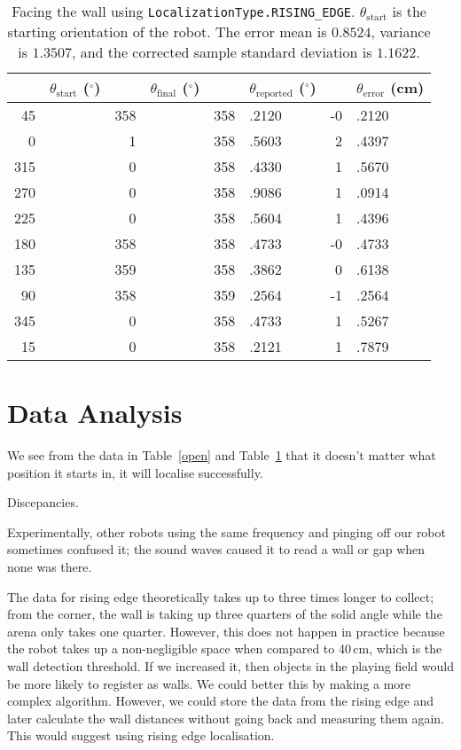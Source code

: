 \documentclass[twocolumn]{article}
\def\degree{\ensuremath{^\circ}}
\begin{document}
\begin{table*}[htb]
\begin{center}\begin{tabular}{r@{}l r@{}l r@{}l r@{}l}
&$\theta_{\text{start}}$ (\degree)& &$\theta_{\text{final}}$ (\degree)& &$\theta_{\text{reported}}$ (\degree)& &$\theta_{\text{error}}$ (cm) \\
\hline
45&& 358&& 358&.2120& -0&.2120 \\
0&& 1&& 358&.5603& 2&.4397 \\
315&& 0&& 358&.4330& 1&.5670 \\
270&& 0&& 358&.9086& 1&.0914 \\
225&& 0&& 358&.5604& 1&.4396 \\
180&& 358&& 358&.4733& -0&.4733 \\
135&& 359&& 358&.3862& 0&.6138 \\
90&& 358&& 359&.2564& -1&.2564 \\
345&& 0&& 358&.4733& 1&.5267 \\
15&& 0&& 358&.2121& 1&.7879 \\
\end{tabular}\end{center}
\caption{Facing the wall using {\tt LocalizationType.RISING\_EDGE}.
$\theta_{\text{start}}$ is the starting orientation of the robot.
The error mean is $0.8524$, variance is $1.3507$, and the corrected sample standard deviation is $1.1622$.}
\label{wall}
\end{table*}

\section{Data Analysis}

We see from the data in Table~\ref{open} and Table~\ref{wall} that it doesn't matter what position it starts in, it will localise successfully.

Discepancies.

Experimentally, other robots using the same frequency and pinging off our robot sometimes confused it; the sound waves caused it to read a wall or gap when none was there.

The data for rising edge theoretically takes up to three times longer to collect; from the corner, the wall is taking up three quarters of the solid angle while the arena only takes one quarter. However, this does not happen in practice because the robot takes up a non-negligible space when compared to 40\,cm, which is the wall detection threshold. If we increased it, then objects in the playing field would be more likely to register as walls. We could better this by making a more complex algorithm. However, we could store the data from the rising edge and later calculate the wall distances without going back and measuring them again. This would suggest using rising edge localisation.
\end{document}
